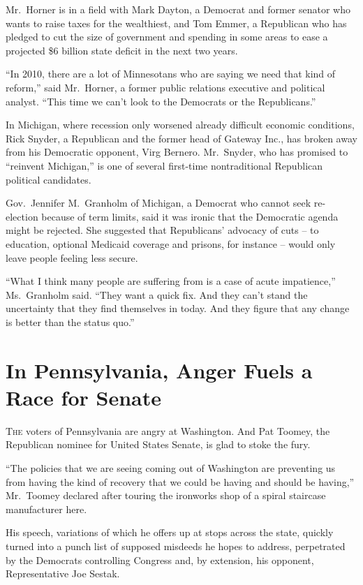 ﻿\documentclass[12pt]{article}
\begin{document}
Mr.~Horner is in a field with Mark Dayton, a Democrat and former senator who wants to raise taxes
for the wealthiest, and Tom Emmer, a Republican who has pledged to cut the size of government and
spending in some areas to ease a projected \$6 billion state deficit in the next two years.

``In 2010, there are a lot of Minnesotans who are saying we need that kind of reform,'' said
Mr.~Horner, a former public relations executive and political analyst. ``This time we can't look to
the Democrats or the Republicans.''

In Michigan, where recession only worsened already difficult economic conditions, Rick Snyder, a
Republican and the former head of Gateway Inc., has broken away from his Democratic opponent, Virg
Bernero. Mr.~Snyder, who has promised to ``reinvent Michigan,'' is one of several first-time
nontraditional Republican political candidates.

Gov.~Jennifer M.~Granholm of Michigan, a Democrat who cannot seek re-election because of term
limits, said it was ironic that the Democratic agenda might be rejected. She suggested that
Republicans' advocacy of cuts -- to education, optional Medicaid coverage and prisons, for instance
-- would only leave people feeling less secure.

``What I think many people are suffering from is a case of acute impatience,'' Ms.~Granholm said.
``They want a quick fix. And they can't stand the uncertainty that they find themselves in today.
And they figure that any change is better than the status quo.''

\section{In Pennsylvania, Anger Fuels a Race for Senate}

\lettrine{T}{he} voters of Pennsylvania are angry at Washington. And Pat
Toomey, the Republican nominee for United States Senate, is glad to stoke the fury.

``The policies that we are seeing coming out of Washington are preventing us from having the kind of
recovery that we could be having and should be having,'' Mr.~Toomey declared after touring the
ironworks shop of a spiral staircase manufacturer here.

His speech, variations of which he offers up at stops across the state, quickly turned into a punch
list of supposed misdeeds he hopes to address, perpetrated by the Democrats controlling Congress
and, by extension, his opponent, Representative Joe Sestak.
\end{document}

